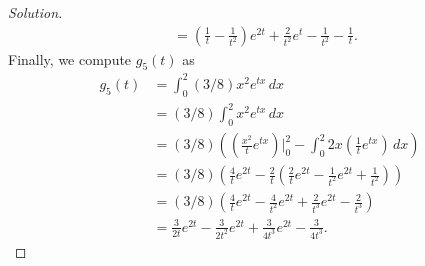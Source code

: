 \documentclass[letterpaper, 10 pt, conference]{article}
\begin{document}
\begin{proof}[Solution]
\begin{align}
    	&= (\frac{1}{t} - \frac{1}{t^2}) e^{2t} + \frac{2}{t^2} e^t - \frac{1}{t^2} - \frac{1}{t} .
    \end{align}
    Finally, we compute $g_5 (t)$ as 
    \begin{align}
    	g_5 (t) &= \int_{0}^{2} (3/8) x^2 e^{tx} \, dx \\
    	&= (3/8) \int_{0}^{2} x^2 e^{tx} \, dx \\
    	&= (3/8) \left( (\frac{x^2}{t} e^{tx}) \Big\lvert^{2}_{0} - \int_{0}^{2} 2x (\frac{1}{t} e^{tx} ) \, dx \right) \\
    	&= (3/8) \left( \frac{4}{t} e^{2t} - \frac{2}{t} (\frac{2}{t} e^{2t} - \frac{1}{t^2} e^{2t} + \frac{1}{t^2}) \right) \\
    	&= (3/8) \left( \frac{4}{t} e^{2t} - \frac{4}{t^2} e^{2t} + \frac{2}{t^3} e^{2t} - \frac{2}{t^3} \right)\\
    	&= \frac{3}{2t} e^{2t} - \frac{3}{2t^2} e^{2t} + \frac{3}{4t^3} e^{2t} - \frac{3}{4t^3}.
    \end{align}
\end{proof}
\end{document}
